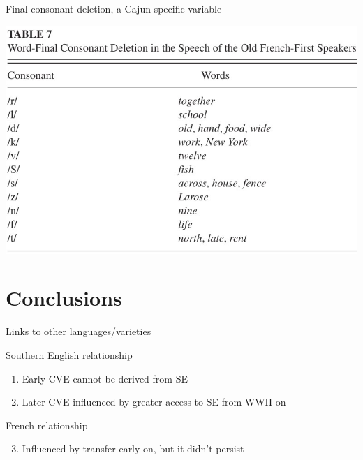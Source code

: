 \documentclass{beamer}
\begin{document}

    \begin{frame}{Final consonant deletion, a Cajun-specific variable}
      \begin{center}
        \includegraphics[scale=0.65]{final_deletion.jpg}
      \end{center}
    \end{frame}

  \section{Conclusions}
    \begin{frame}{Links to other languages/varieties}
      \begin{block}{Southern English relationship}
        \begin{enumerate}
          \item Early CVE cannot be derived from SE
          \item Later CVE influenced by greater access to SE from WWII on
        \end{enumerate}
      \end{block}
      \begin{block}{French relationship}
        \begin{enumerate}
          \setcounter{enumi}{2}
          \item Influenced by transfer early on, but it didn't persist
        \end{enumerate}
      \end{block}
    \end{frame}
\end{document}
